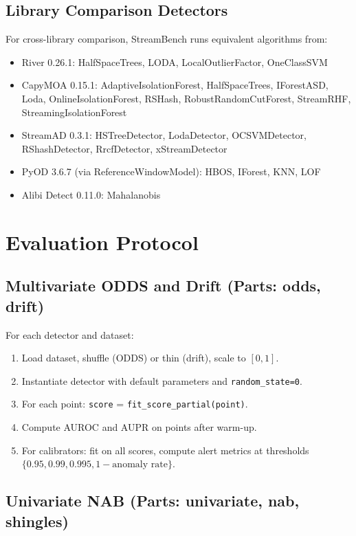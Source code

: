 \documentclass[11pt,a4paper]{article}
\begin{document}
\subsection{Library Comparison Detectors}
\label{sec:lib_detectors}

For cross-library comparison, StreamBench runs equivalent algorithms from:
\begin{itemize}
    \item River 0.26.1: HalfSpaceTrees, LODA, LocalOutlierFactor, OneClassSVM
    \item CapyMOA 0.15.1: AdaptiveIsolationForest, HalfSpaceTrees, IForestASD, Loda, OnlineIsolationForest, RSHash, RobustRandomCutForest, StreamRHF, StreamingIsolationForest
    \item StreamAD 0.3.1: HSTreeDetector, LodaDetector, OCSVMDetector, RShashDetector, RrcfDetector, xStreamDetector
    \item PyOD 3.6.7 (via ReferenceWindowModel): HBOS, IForest, KNN, LOF
    \item Alibi Detect 0.11.0: Mahalanobis
\end{itemize}

\section{Evaluation Protocol}
\label{sec:protocol}

\subsection{Multivariate ODDS and Drift (Parts: odds, drift)}
\label{sec:proto_odds}

For each detector and dataset:
\begin{enumerate}
    \item Load dataset, shuffle (ODDS) or thin (drift), scale to $[0,1]$.
    \item Instantiate detector with default parameters and \texttt{random\_state=0}.
    \item For each point: \texttt{score} = \texttt{fit\_score\_partial(point)}.
    \item Compute AUROC and AUPR on points after warm-up.
    \item For calibrators: fit on all scores, compute alert metrics at thresholds $\{0.95, 0.99, 0.995, 1-\text{anomaly rate}\}$.
\end{enumerate}

\subsection{Univariate NAB (Parts: univariate, nab, shingles)}
\label{sec:proto_nab}
\end{document}
